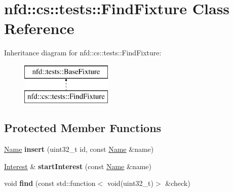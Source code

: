 \hypertarget{classnfd_1_1cs_1_1tests_1_1FindFixture}{}\section{nfd\+:\+:cs\+:\+:tests\+:\+:Find\+Fixture Class Reference}
\label{classnfd_1_1cs_1_1tests_1_1FindFixture}
Inheritance diagram for nfd\+:\+:cs\+:\+:tests\+:\+:Find\+Fixture\+:\begin{figure}[H]
\begin{center}
\leavevmode
\includegraphics[height=2.000000cm]{classnfd_1_1cs_1_1tests_1_1FindFixture}
\end{center}
\end{figure}
\subsection*{Protected Member Functions}
\begin{DoxyCompactItemize}
\item 
\hyperlink{classndn_1_1Name}{Name} {\bfseries insert} (uint32\+\_\+t id, const \hyperlink{classndn_1_1Name}{Name} \&name)\hypertarget{classnfd_1_1cs_1_1tests_1_1FindFixture_abfcf490c602f396c6934a18ee0dd3a2c}{}\label{classnfd_1_1cs_1_1tests_1_1FindFixture_abfcf490c602f396c6934a18ee0dd3a2c}

\item 
\hyperlink{classndn_1_1Interest}{Interest} \& {\bfseries start\+Interest} (const \hyperlink{classndn_1_1Name}{Name} \&name)\hypertarget{classnfd_1_1cs_1_1tests_1_1FindFixture_af5bc8a870f3803de6a64a14961f11e5c}{}\label{classnfd_1_1cs_1_1tests_1_1FindFixture_af5bc8a870f3803de6a64a14961f11e5c}

\item 
void {\bfseries find} (const std\+::function$<$ void(uint32\+\_\+t)$>$ \&check)\hypertarget{classnfd_1_1cs_1_1tests_1_1FindFixture_aead3bf34be54d9be9302b1de13399ce6}{}\label{classnfd_1_1cs_1_1tests_1_1FindFixture_aead3bf34be54d9be9302b1de13399ce6}

\end{DoxyCompactItemize}
